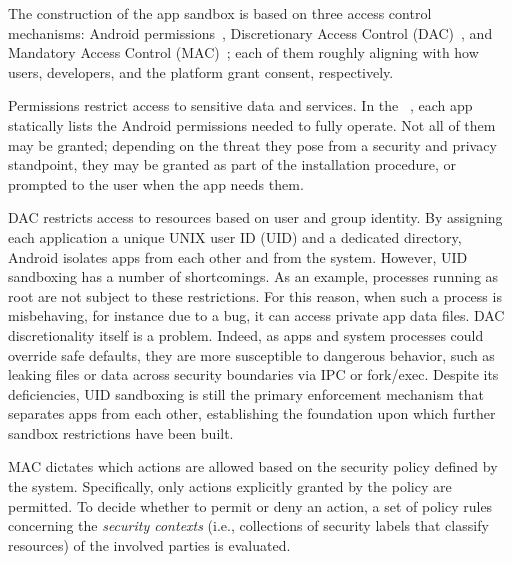 The construction of the app sandbox is based on three access control
mechanisms: Android permissions~\cite{seapp_andro_perm,
  seapp_10.1145/2046707.2046779,seapp_10.1145/2335356.2335360},
Discretionary Access Control
(DAC)~\cite{seapp_10.1145/3134600.3134638}, and Mandatory Access
Control (MAC)~\cite{seapp_dacmac}; each of them roughly aligning with
how users, developers, and the platform grant consent, respectively.

Permissions restrict access to sensitive data and services.  In
the \manifest~\cite{seapp_andro_man}, each app statically lists the
Android permissions needed to fully operate.  Not all of them may be
granted; depending on the threat they pose from a security and privacy
standpoint, they may be granted as part of the installation procedure,
or prompted to the user when the app needs them.

DAC restricts access to resources based on user and group identity.
By assigning each application a unique UNIX user ID (UID) and a
dedicated directory, Android isolates apps from each other and from
the system.  However, UID sandboxing has a number of shortcomings.  As
an example, processes running as root are not subject to these
restrictions.  For this reason, when such a process is misbehaving,
for instance due to a bug, it can access private app data files.  DAC
discretionality itself is a problem.  Indeed, as apps and system
processes could override safe defaults, they are more susceptible to
dangerous behavior, such as leaking files or data across security
boundaries via IPC or fork/exec.  Despite its deficiencies, UID
sandboxing is still the primary enforcement mechanism that separates
apps from each other, establishing the foundation upon which further
sandbox restrictions have been built.

MAC dictates which actions are allowed based on the security policy
defined by the system.  Specifically, only actions explicitly granted
by the policy are permitted.  To decide whether to permit or deny an
action, a set of policy rules concerning the {\em security contexts}
(i.e., collections of security labels that classify resources) of the
involved parties is evaluated.

